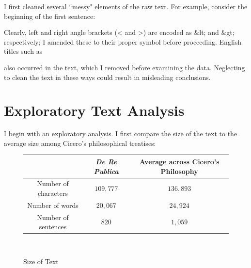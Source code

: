 \documentclass[a4paper, 12pt,notitlepage]{article} %
\newenvironment{tightcenter}{%
	\setlength\topsep{2pt}
	\setlength\parskip{2pt}
	\singlespacing %
	\begin{center}
	}{%
	\end{center}
}
\newenvironment{figurecenter}{%
	\setlength\topsep{-7pt}
	\setlength\parskip{-7pt}
	\singlespacing %
	\begin{center}
	}{%
	\end{center}
\vspace{-5pt}
}
\numberwithin{dummy}{subsection}
\numberwithin{dummy}{section}
\theoremstyle{named}
\theoremstyle{definition}
\theoremstyle{definition}
\begin{document}
	\begin{tightcenter}
	{\small {}} \cite[I.2]{drp}
	\end{tightcenter}

	\noindent I first cleaned several ``messy" elements of the raw text. For example, consider the beginning of the first sentence:
	
	\begin{tightcenter}
		{\small {}} \cite[I.1]{drp}
	\end{tightcenter}

\noindent	Clearly, left and right angle brackets ({\ttfamily <} and {\ttfamily >}) are encoded as {\ttfamily \&lt;} and {\ttfamily \&gt;} respectively; I amended these to their proper symbol before proceeding. English titles such as

	\begin{tightcenter}
		{\small {}}
	\end{tightcenter}

\noindent also occurred in the text, which I removed before examining the data. Neglecting to clean the text in these ways could result in misleading conclusions.

\section{Exploratory Text Analysis}

I begin with an exploratory analysis. I first compare the size of the text to the average size among Cicero's philosophical treatises:

\begin{figure}[H]
	\begin{figurecenter}
	\begin{tabular}{| c | c | c |}
		\hline
		 & \textit{De Re Publica}  &  Average across Cicero's Philosophy \\ \hline
		Number of characters & $109,777$  &  $136,893$ \\ \hline
		Number of words  & $20,067$  & $24,924$  \\ \hline
		Number of sentences & $820$  & $1,059$  \\
		\hline
	\end{tabular}\\
\caption{Size of Text}
\end{figurecenter}
\end{figure}
\end{document}
